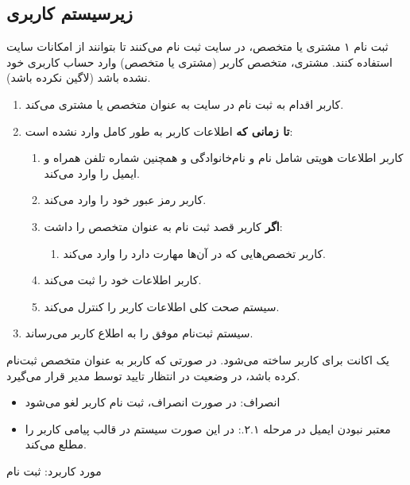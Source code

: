 \subsection{زیرسیستم کاربری}
\renewcommand{\labelenumiii}{\arabic{enumi}.\arabic{enumii}.\arabic{enumiii}}
\usecase
{ثبت نام}
{۱}
{مشتری یا متخصص، در سایت ثبت نام می‌کنند تا بتوانند از امکانات سایت استفاده کنند.}
{مشتری، متخصص}
{}{کاربر (مشتری یا متخصص) وارد حساب کاربری خود نشده باشد (لاگین نکرده باشد).}
{
\vspace*{-0.6cm}
\begin{enumerate}
	\item 
	کاربر اقدام به ثبت نام در سایت به عنوان متخصص یا مشتری می‌کند.
	\item
	\textbf{تا زمانی که} اطلاعات کاربر به طور کامل وارد نشده است:
	
	\begin{enumerate}[label=\theenumi.\arabic*.]
	\item
	کاربر اطلاعات هویتی شامل نام و نام‌خانوادگی و همچنین شماره تلفن همراه و ایمیل را وارد می‌کند.
	\item 
	کاربر رمز عبور خود را وارد می‌کند.
	
	\item 
	\textbf{اگر} کاربر قصد ثبت نام به عنوان متخصص را داشت:
	\begin{enumerate}
		\item 
		کاربر تخصص‌هایی که در آن‌ها مهارت دارد را وارد می‌کند.
	\end{enumerate}

	\item 
	کاربر اطلاعات خود را ثبت می‌کند.
	
	\item 
	سیستم صحت کلی اطلاعات کاربر را کنترل می‌کند.
	\end{enumerate}
	
	\item 
	سیستم ثبت‌نام موفق را به اطلاع کاربر می‌رساند.
	
	
\end{enumerate}
}
{یک اکانت برای کاربر ساخته می‌شود. در صورتی که کاربر به عنوان متخصص ثبت‌نام کرده باشد، در وضعیت در انتظار تایید توسط مدیر قرار می‌گیرد.}
{\begin{itemize}
		\vspace*{-0.6cm}
		\item انصراف: در صورت انصراف، ثبت نام کاربر لغو می‌شود
		\item معتبر نبودن ایمیل در مرحله ۲.۱.: در این صورت سیستم در قالب پیامی کاربر را مطلع می‌کند.
		
		
\end{itemize}}
{مورد کاربرد: ثبت نام}



